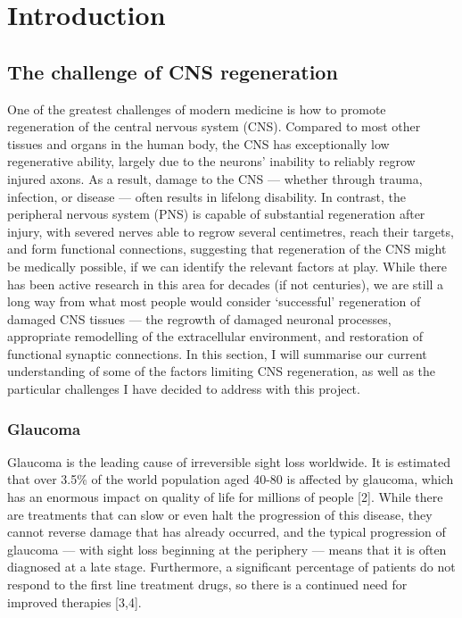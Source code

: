 \documentclass[
  12pt,
  a4paper,
]{book}
\begin{document}
\hypertarget{INTRODUCTION}{%
\chapter*{Introduction}\label{INTRODUCTION}}


\hypertarget{the-challenge-of-cns-regeneration}{%
\section{The challenge of CNS regeneration}\label{the-challenge-of-cns-regeneration}}

One of the greatest challenges of modern medicine is how to promote regeneration of the central nervous system (CNS). Compared to most other tissues and organs in the human body, the CNS has exceptionally low regenerative ability, largely due to the neurons' inability to reliably regrow injured axons. As a result, damage to the CNS --- whether through trauma, infection, or disease --- often results in lifelong disability. In contrast, the peripheral nervous system (PNS) is capable of substantial regeneration after injury, with severed nerves able to regrow several centimetres, reach their targets, and form functional connections, suggesting that regeneration of the CNS might be medically possible, if we can identify the relevant factors at play. While there has been active research in this area for decades (if not centuries), we are still a long way from what most people would consider `successful' regeneration of damaged CNS tissues --- the regrowth of damaged neuronal processes, appropriate remodelling of the extracellular environment, and restoration of functional synaptic connections. In this section, I will summarise our current understanding of some of the factors limiting CNS regeneration, as well as the particular challenges I have decided to address with this project.

\hypertarget{glaucoma}{%
\subsection{Glaucoma}\label{glaucoma}}

Glaucoma is the leading cause of irreversible sight loss worldwide. It is estimated that over 3.5\% of the world population aged 40-80 is affected by glaucoma, which has an enormous impact on quality of life for millions of people {[}2{]}. While there are treatments that can slow or even halt the progression of this disease, they cannot reverse damage that has already occurred, and the typical progression of glaucoma --- with sight loss beginning at the periphery --- means that it is often diagnosed at a late stage. Furthermore, a significant percentage of patients do not respond to the first line treatment drugs, so there is a continued need for improved therapies {[}3,4{]}.
\end{document}
